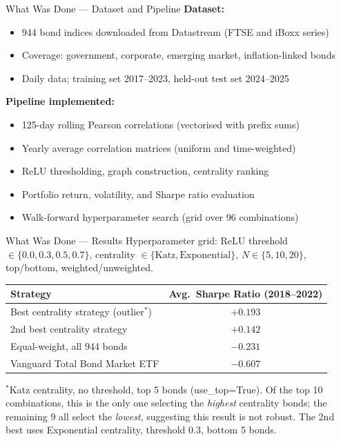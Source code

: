 \documentclass[aspectratio=169]{beamer}
\begin{document}
\begin{frame}{What Was Done --- Dataset and Pipeline}
    \textbf{Dataset:}
    \begin{itemize}
        \item 944 bond indices downloaded from Datastream (FTSE and iBoxx series)
        \item Coverage: government, corporate, emerging market, inflation-linked bonds
        \item Daily data; training set 2017--2023, held-out test set 2024--2025
    \end{itemize}

    \bigskip
    \textbf{Pipeline implemented:}
    \begin{itemize}
        \item 125-day rolling Pearson correlations (vectorised with prefix sums)
        \item Yearly average correlation matrices (uniform and time-weighted)
        \item ReLU thresholding, graph construction, centrality ranking
        \item Portfolio return, volatility, and Sharpe ratio evaluation
        \item Walk-forward hyperparameter search (grid over 96 combinations)
    \end{itemize}
\end{frame}

\begin{frame}{What Was Done --- Results}
    Hyperparameter grid: ReLU threshold $\in \{0.0, 0.3, 0.5, 0.7\}$,
    centrality $\in \{\text{Katz}, \text{Exponential}\}$,
    $N \in \{5, 10, 20\}$, top/bottom, weighted/unweighted.

    \bigskip
    \begin{table}
        \centering
        \begin{tabular}{lc}
            \toprule
            Strategy & Avg.\ Sharpe Ratio (2018--2022) \\
            \midrule
            Best centrality strategy (outlier$^*$) & $+0.193$ \\
            2nd best centrality strategy           & $+0.142$ \\
            Equal-weight, all 944 bonds            & $-0.231$ \\
            Vanguard Total Bond Market ETF         & $-0.607$ \\
            \bottomrule
        \end{tabular}
    \end{table}

    \medskip
    {\small $^*$Katz centrality, no threshold, top 5 bonds (use\_top=True).
    Of the top 10 combinations, this is the only one selecting the \emph{highest} centrality bonds;
    the remaining 9 all select the \emph{lowest}, suggesting this result is not robust.
    The 2nd best uses Exponential centrality, threshold 0.3, bottom 5 bonds.}
\end{frame}
\end{document}
